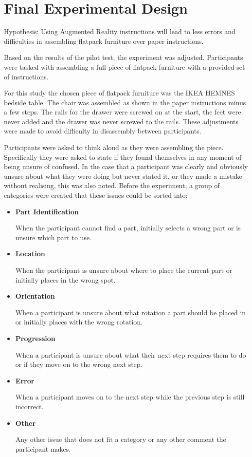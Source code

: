\documentclass{l4proj}
\begin{document}
\section{Final Experimental Design}
Hypothesis: Using Augmented Reality instructions will lead to less errors and difficulties in assembling flatpack furniture over paper instructions.

Based on the results of the pilot test, the experiment was adjusted. Participants were tasked with assembling a full piece of flatpack furniture with a provided set of instructions. 

For this study the chosen piece of flatpack furniture was the IKEA HEMNES bedside table. The chair was assembled as shown in the paper instructions minus a few steps. The rails for the drawer were screwed on at the start, the feet were never added and the drawer was never screwed to the rails. These adjustments were made to avoid difficulty in disassembly between participants.

Participants were asked to think aloud as they were assembling the piece. Specifically they were asked to state if they found themselves in any moment of being unsure of confused. In the case that a participant was clearly and obviously unsure about what they were doing but never stated it, or they made a mistake without realising, this was also noted. Before the experiment, a group of categories were created that these issues could be sorted into:

\begin{itemize}
    \item \textbf{Part Identification}
    
    When the participant cannot find a part, initially selects a wrong part or is unsure which part to use. 
    
    \item \textbf{Location}
    
    When the participant is unsure about where to place the current part or initially places in the wrong spot.
    
    \item \textbf{Orientation}
    
    When a participant is unsure about what rotation a part should be placed in or initially places with the wrong rotation.
    
    \item \textbf{Progression}
    
    When a participant is unsure about what their next step requires them to do or if they move on to the wrong next step.
    
    \item \textbf{Error}
    
    When a participant moves on to the next step while the previous step is still incorrect.
    
    \item \textbf{Other}
    
    Any other issue that does not fit a category or any other comment the participant makes.
    
\end{itemize}
\end{document}
